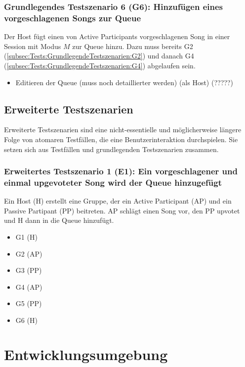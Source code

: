 \documentclass[oneside, ngerman]{sdqtechreport}
\begin{document}
\subsection{Grundlegendes Testszenario 6 (G6): Hinzufügen eines vorgeschlagenen Songs zur Queue}
\label{subsec:Tests:GrundlegendeTestszenarien:G6}
Der Host fügt einen von Active Participants vorgeschlagenen Song in einer Session mit Modus $M$ zur Queue hinzu.
Dazu muss bereits G2 (\ref{subsec:Tests:GrundlegendeTestszenarien:G2}) und danach G4 (\ref{subsec:Tests:GrundlegendeTestszenarien:G4}) abgelaufen sein.
\begin{itemize}
    \item Editieren der Queue (muss noch detaillierter werden) (als Host) (?????)
\end{itemize}



\section{Erweiterte Testszenarien}
\label{sec:Tests:ErweiterteTestszenarien}

Erweiterte Testszenarien sind eine nicht-essentielle und möglicherweise längere Folge von atomaren Testfällen, die eine Benutzerinteraktion durchspielen. Sie setzen sich aus Testfällen und grundlegenden Testszenarien zusammen.

\subsection{Erweitertes Testszenario 1 (E1): Ein vorgeschlagener und einmal upgevoteter Song wird der Queue hinzugefügt}
\label{subsec:Tests:ErweiterteTestszenarien:E1}
Ein Host (H) erstellt eine Gruppe, der ein Active Participant (AP) und ein Passive Partipant (PP) beitreten. AP schlägt einen Song vor, den PP upvotet und H dann in die Queue hinzufügt.
\begin{itemize}
    \item G1 (H)
    \item G2 (AP)
    \item G3 (PP)
    \item G4 (AP)
    \item G5 (PP)
    \item G6 (H)
\end{itemize}



\chapter{Entwicklungsumgebung}
\label{chap:Entwicklungsumgebung}
\end{document}
